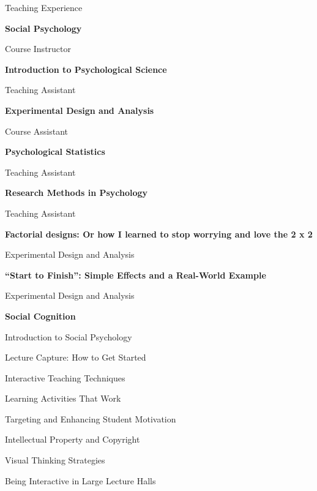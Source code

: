\begin{rubric}{Teaching Experience}

\textbf{Social Psychology} \par Course Instructor


\textbf{Introduction to Psychological Science} \par Teaching Assistant

\textbf{Experimental Design and Analysis} \par Course Assistant

\entry*[Fall 2011]
\textbf{Psychological Statistics} \par Teaching Assistant

\textbf{Research Methods in Psychology} \par Teaching Assistant

\entry*[Spring 2012]
\textbf{Factorial designs: Or how I learned to stop worrying and love the 2 x 2} \par
Experimental Design and Analysis

\entry*[Spring 2012]
\textbf{``Start to Finish'': Simple Effects and a Real-World Example} \par
Experimental Design and Analysis

\entry*[Fall 2012]
\textbf{Social Cognition} \par
Introduction to Social Psychology


\entry*[May 28, 2013]
Lecture Capture: How to Get Started

\entry*[May 31, 2013]
Interactive Teaching Techniques

\entry*[July 1, 2013]
Learning Activities That Work

\entry*[July 10, 2013]
Targeting and Enhancing Student Motivation

\entry*[August 8, 2013]
Intellectual Property and Copyright

\entry*[August 9, 2013]
Visual Thinking Strategies

\entry*[August 19, 2013]
Being Interactive in Large Lecture Halls

\end{rubric}
